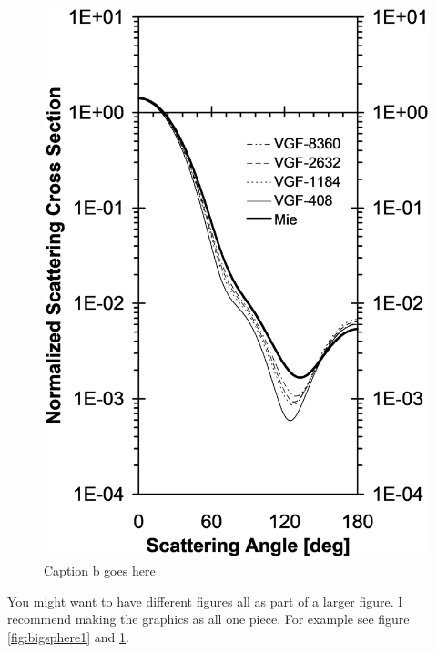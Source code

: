 \begin{figure}[htb!]
\begin{minipage}{0.45\textwidth}
		\includegraphics[width=0.9\linewidth, height=0.35\textheight]{test70}
		\caption{Caption b goes here}
		\label{fig:bigsphere2}
	\end{minipage}
\end{figure}
You might want to have different figures all as part of a larger figure. I recommend making the graphics as all one piece.  For example see figure \ref{fig:bigsphere1} and \ref{fig:bigsphere2}.

